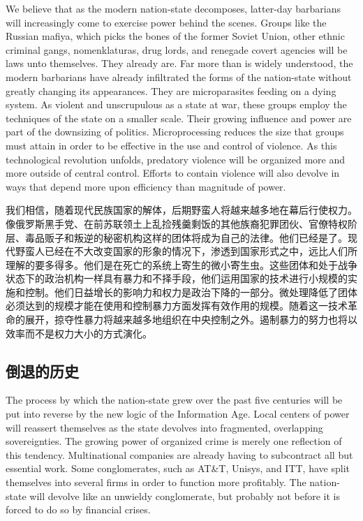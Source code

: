 \begin{Parallel}{97mm}{45mm}
  \ParallelPar  

  \ParallelLText
  {We believe that as the modern nation-state decomposes, latter-day barbarians will increasingly come to exercise power behind the scenes. Groups like the Russian mafiya, which picks the bones of the former Soviet Union, other ethnic criminal gangs, nomenklaturas, drug lords, and renegade covert agencies will be laws unto themselves. They already are. Far more than is widely understood, the modern barbarians have already infiltrated the forms of the nation-state without greatly changing its appearances. They are microparasites feeding on a dying system. As violent and unscrupulous as a state at war, these groups employ the techniques of the state on a smaller scale. Their growing influence and power are part of the downsizing of politics. Microprocessing reduces the size that groups must attain in order to be effective in the use and control of violence. As this technological revolution unfolds, predatory violence will be organized more and more outside of central control. Efforts to contain violence will also devolve in ways that depend more upon efficiency than magnitude of power. }
  
  \ParallelRText
  {\small 我们相信，随着现代民族国家的解体，后期野蛮人将越来越多地在幕后行使权力。像俄罗斯黑手党、在前苏联领土上乱捡残羹剩饭的其他族裔犯罪团伙、官僚特权阶层、毒品贩子和叛逆的秘密机构这样的团体将成为自己的法律。他们已经是了。现代野蛮人已经在不大改变国家的形象的情况下，渗透到国家形式之中，远比人们所理解的要多得多。他们是在死亡的系统上寄生的微小寄生虫。这些团体和处于战争状态下的政治机构一样具有暴力和不择手段，他们运用国家的技术进行小规模的实施和控制。他们日益增长的影响力和权力是政治下降的一部分。微处理降低了团体必须达到的规模才能在使用和控制暴力方面发挥有效作用的规模。随着这一技术革命的展开，掠夺性暴力将越来越多地组织在中央控制之外。遏制暴力的努力也将以效率而不是权力大小的方式演化。 }
  \ParallelPar

\subsection{倒退的历史}
 
  \ParallelLText
  {The process by which the nation-state grew over the past five centuries will be put into reverse by the new logic of the Information Age. Local centers of power will reassert themselves as the state devolves into fragmented, overlapping sovereignties. The growing power of organized crime is merely one reflection of this tendency. Multinational companies are already having to subcontract all but essential work. Some conglomerates, such as AT\&T, Unisys, and ITT, have split themselves into several firms in order to function more profitably. The nation-state will devolve like an unwieldy conglomerate, but probably not before it is forced to do so by financial crises.   }
  

\end{Parallel}
